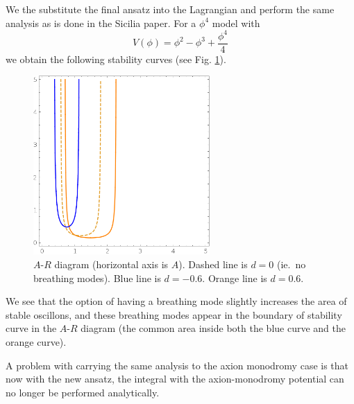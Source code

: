 \documentclass{report}
\begin{document}
We the substitute the final ansatz into the Lagrangian and perform the same analysis as is done in the Sicilia paper. For a $\phi^4$ model with
\begin{equation}
  V(\phi) = \phi^2 - \phi^3 + \frac{\phi^4}{4}
\end{equation}
we obtain the following stability curves (see Fig. \ref{stability}).
\begin{figure}\centering
  \includegraphics[width=0.6\textwidth]{plot/small-stability.png}
  \caption{$A$-$R$ diagram (horizontal axis is $A$). Dashed line is $d=0$ (ie.~no breathing modes). Blue line is $d=-0.6$. Orange line is $d=0.6$.}\label{stability}
\end{figure}

We see that the option of having a breathing mode slightly increases the area of stable oscillons, and these breathing modes appear in the boundary of stability curve in the $A$-$R$ diagram (the common area inside both the blue curve and the orange curve).

A problem with carrying the same analysis to the axion monodromy case is that now with the new ansatz, the integral with the axion-monodromy potential can no longer be performed analytically.



\end{document}
